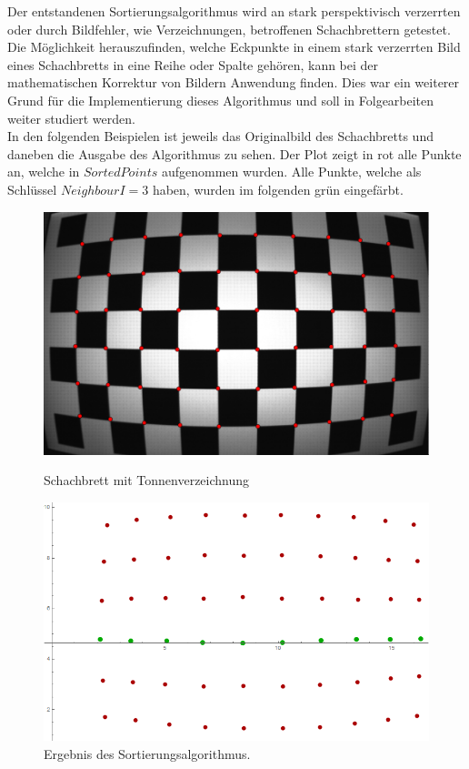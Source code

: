 Der entstandenen Sortierungsalgorithmus wird an stark perspektivisch verzerrten oder durch Bildfehler, wie Verzeichnungen, betroffenen Schachbrettern getestet. Die Möglichkeit herauszufinden, welche Eckpunkte in einem stark verzerrten Bild eines Schachbretts in eine Reihe oder Spalte gehören, kann bei der mathematischen Korrektur von Bildern Anwendung finden. Dies war ein weiterer Grund für die Implementierung dieses Algorithmus und soll in Folgearbeiten weiter studiert werden. \\


In den folgenden Beispielen ist jeweils das Originalbild des Schachbretts und daneben die Ausgabe des Algorithmus zu sehen. Der Plot zeigt in rot alle Punkte an, welche in $SortedPoints$ aufgenommen wurden. Alle Punkte, welche als Schlüssel $NeighbourI = 3$ haben, wurden im folgenden grün eingefärbt.


\begin{figure}[!htb]
	\includegraphics[width=\linewidth]{images/Tonnenverzeichnung.png}
	\caption[Schachbrett mit Tonnenverzeichnung]{Schachbrett mit Tonnenverzeichnung}
	\label{fig:Extreme1}
	\endminipage\hfill
	\includegraphics[width=\linewidth]{images/AlgTonnenverzeichnung.png}
	\caption[Sortierte Punkte eines Schachbretts mit Tonnenverzeichnung]{Ergebnis des Sortierungsalgorithmus.}
	\label{fig:Extreme2}
	\endminipage\hfill
\end{figure}

